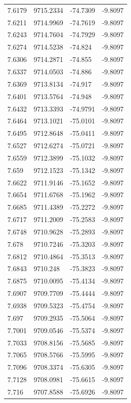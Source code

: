 \begin{table}[H]
\begin{tabular}{llll}
7.6179 & 9715.2334 & -74.7309 & -9.8097 \\
7.6211 & 9714.9969 & -74.7619 & -9.8097 \\
7.6243 & 9714.7604 & -74.7929 & -9.8097 \\
7.6274 & 9714.5238 & -74.824 & -9.8097 \\
7.6306 & 9714.2871 & -74.855 & -9.8097 \\
7.6337 & 9714.0503 & -74.886 & -9.8097 \\
7.6369 & 9713.8134 & -74.917 & -9.8097 \\
7.6401 & 9713.5764 & -74.948 & -9.8097 \\
7.6432 & 9713.3393 & -74.9791 & -9.8097 \\
7.6464 & 9713.1021 & -75.0101 & -9.8097 \\
7.6495 & 9712.8648 & -75.0411 & -9.8097 \\
7.6527 & 9712.6274 & -75.0721 & -9.8097 \\
7.6559 & 9712.3899 & -75.1032 & -9.8097 \\
7.659 & 9712.1523 & -75.1342 & -9.8097 \\
7.6622 & 9711.9146 & -75.1652 & -9.8097 \\
7.6654 & 9711.6768 & -75.1962 & -9.8097 \\
7.6685 & 9711.4389 & -75.2272 & -9.8097 \\
7.6717 & 9711.2009 & -75.2583 & -9.8097 \\
7.6748 & 9710.9628 & -75.2893 & -9.8097 \\
7.678 & 9710.7246 & -75.3203 & -9.8097 \\
7.6812 & 9710.4864 & -75.3513 & -9.8097 \\
7.6843 & 9710.248 & -75.3823 & -9.8097 \\
7.6875 & 9710.0095 & -75.4134 & -9.8097 \\
7.6907 & 9709.7709 & -75.4444 & -9.8097 \\
7.6938 & 9709.5323 & -75.4754 & -9.8097 \\
7.697 & 9709.2935 & -75.5064 & -9.8097 \\
7.7001 & 9709.0546 & -75.5374 & -9.8097 \\
7.7033 & 9708.8156 & -75.5685 & -9.8097 \\
7.7065 & 9708.5766 & -75.5995 & -9.8097 \\
7.7096 & 9708.3374 & -75.6305 & -9.8097 \\
7.7128 & 9708.0981 & -75.6615 & -9.8097 \\
7.716 & 9707.8588 & -75.6926 & -9.8097 \\

\end{tabular}
\end{table}
